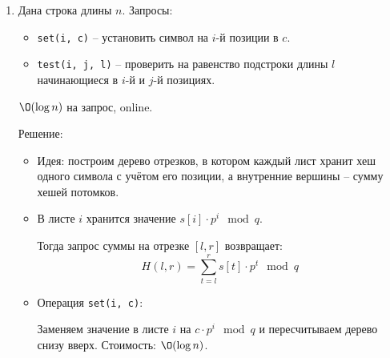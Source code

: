 \begin{enumerate}
\begin{itemize}
      \item Сложность по времени:
      \begin{itemize}
        \item Предподсчёт хешей: $\O(n)$

        \item Проверка одного индекса $i$: не более $(k + 1)$ бинарных поисков
        (после $k+1$ несовпадений алгоритм останавливается), каждый за $\O(\log n)$.
        Итого на один индекс: $\O(k \log n)$.

        \item Всего позиций: $n - m + 1 \leq n$.
      \end{itemize}

      Итого: $\O(n) + n \cdot \O(k \log n) = \O(nk \log n)$

      \item Сложность по памяти: $\O(n)$ -- массивы хешей и степеней.

    \end{itemize}

  \item
    Дана строка длины $n$. Запросы:
    \begin{itemize}
      \item \texttt{set(i, c)} -- установить символ на $i$-й позиции в $c$.
      \item \texttt{test(i, j, l)} -- проверить на равенство подстроки длины $l$ начинающиеся в $i$-й и $j$-й позициях.
    \end{itemize}
    $\O(\log{n})$ на запрос, online.

    Решение:

    \begin{itemize}
      \item Идея: построим дерево отрезков, в котором каждый лист хранит хеш одного символа с учётом его позиции,
      а внутренние вершины -- сумму хешей потомков.

      \item В листе $i$ хранится значение $s[i] \cdot p^i \mod q$.

      Тогда запрос суммы на отрезке $[l, r]$ возвращает:
      $$H(l, r) = \sum_{t=l}^{r} s[t] \cdot p^t \mod q$$

      \item Операция \texttt{set(i, c)}:
      
      Заменяем значение в листе $i$ на $c \cdot p^i \mod q$ и пересчитываем дерево снизу вверх.
      Стоимость: $\O(\log n)$.


\end{itemize}
\end{enumerate}
